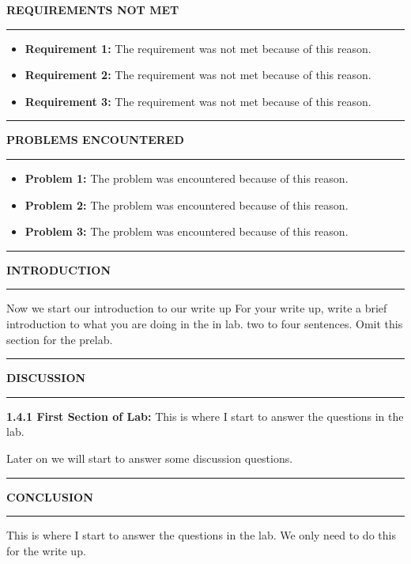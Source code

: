 \documentclass{article}
\begin{document}

\begin{center}
    \textbf{\large REQUIREMENTS NOT MET}

    \hrule
\end{center}
\begin{itemize}
    \item \textbf{Requirement 1:} The requirement was not met because of this reason.
    \item \textbf{Requirement 2:} The requirement was not met because of this reason.
    \item \textbf{Requirement 3:} The requirement was not met because of this reason.
\end{itemize}

\begin{center}
    \hrule
    \vspace{0.2cm}
    \textbf{\large PROBLEMS ENCOUNTERED}
    \vspace{0.2cm}
    \hrule
\end{center}
\begin{itemize}
    \item \textbf{Problem 1:} The problem was encountered because of this reason.
    \item \textbf{Problem 2:} The problem was encountered because of this reason.
    \item \textbf{Problem 3:} The problem was encountered because of this reason.
\end{itemize}

\begin{center}
    \hrule
    \vspace{0.2cm}
    \textbf{\large INTRODUCTION}
    \vspace{0.2cm}
    \hrule
\end{center}

Now we start our introduction to our write up
For your write up, write a brief introduction to what you are doing in the in lab. two to four sentences. 
Omit this section for the prelab.


\begin{center}
    \hrule
    \vspace{0.2cm}
    \textbf{\large DISCUSSION}
    \vspace{0.2cm}
    \hrule
\end{center}

\textbf{1.4.1 First Section of Lab:}
This is where I start to answer the questions in the lab.

Later on we will start to answer some discussion questions.

\begin{center}
    \hrule
    \vspace{0.2cm}
    \textbf{\large CONCLUSION}
    \vspace{0.2cm}
    \hrule
\end{center}

This is where I start to answer the questions in the lab. We only need to do this for the write up.
\end{document}

